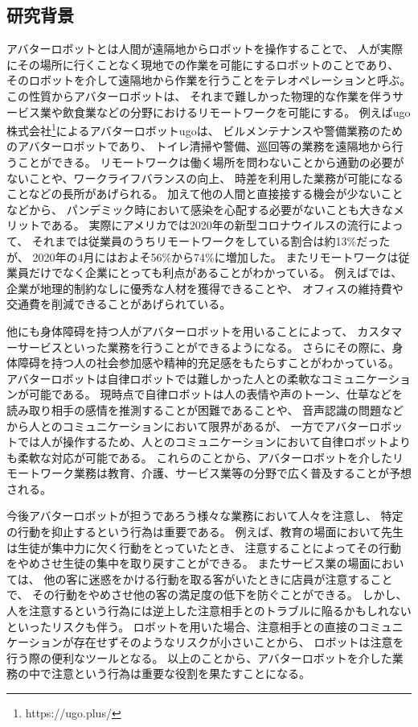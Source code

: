 \documentclass{kuisthesis}
\begin{document}
\subsection{研究背景} %
アバターロボットとは人間が遠隔地からロボットを操作することで、
人が実際にその場所に行くことなく現地での作業を可能にするロボットのことであり、
そのロボットを介して遠隔地から作業を行うことをテレオペレーションと呼ぶ。
この性質からアバターロボットは、
それまで難しかった物理的な作業を伴うサービス業や飲食業などの分野におけるリモートワークを可能にする。
例えばugo株式会社\footnote{https://ugo.plus/}によるアバターロボットugoは、
ビルメンテナンスや警備業務のためのアバターロボットであり、
トイレ清掃や警備、巡回等の業務を遠隔地から行うことができる。
リモートワークは働く場所を問わないことから通勤の必要がないことや、ワークライフバランスの向上、
時差を利用した業務が可能になることなどの長所があげられる。
加えて他の人間と直接接する機会が少ないことなどから、
パンデミック時において感染を心配する必要がないことも大きなメリットである。
実際にアメリカでは2020年の新型コロナウイルスの流行によって、
それまでは従業員のうちリモートワークをしている割合は約13\%だったが、
2020年の4月にはおよそ56\%から74\%に増加した\cite{ozimek2020future}。
またリモートワークは従業員だけでなく企業にとっても利点があることがわかっている。
例えば\cite{FERREIRA202170}では、企業が地理的制約なしに優秀な人材を獲得できることや、
オフィスの維持費や交通費を削減できることがあげられている。

他にも身体障碍を持つ人がアバターロボットを用いることによって、
カスタマーサービスといった業務を行うことができるようになる。
さらにその際に、身体障碍を持つ人の社会参加感や精神的充足感をもたらすことがわかっている\cite{takeuchi2020avatar}。
アバターロボットは自律ロボットでは難しかった人との柔軟なコミュニケーションが可能である。
現時点で自律ロボットは人の表情や声のトーン、仕草などを読み取り相手の感情を推測することが困難であることや、
音声認識の問題などから人とのコミュニケーションにおいて限界があるが、
一方でアバターロボットでは人が操作するため、人とのコミュニケーションにおいて自律ロボットよりも柔軟な対応が可能である。
これらのことから、アバターロボットを介したリモートワーク業務は教育、介護、サービス業等の分野で広く普及することが予想される。

今後アバターロボットが担うであろう様々な業務において人々を注意し、
特定の行動を抑止するという行為は重要である。
例えば、教育の場面において先生は生徒が集中力に欠く行動をとっていたとき、
注意することによってその行動をやめさせ生徒の集中を取り戻すことができる。
またサービス業の場面においては、
他の客に迷惑をかける行動を取る客がいたときに店員が注意することで、
その行動をやめさせ他の客の満足度の低下を防ぐことができる。
しかし、人を注意するという行為には逆上した注意相手とのトラブルに陥るかもしれないといったリスクも伴う。
ロボットを用いた場合、注意相手との直接のコミュニケーションが存在せずそのようなリスクが小さいことから、
ロボットは注意を行う際の便利なツールとなる。
以上のことから、アバターロボットを介した業務の中で注意という行為は重要な役割を果たすことになる。
\end{document}
